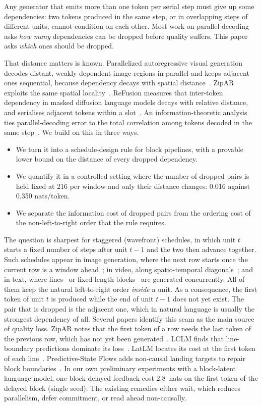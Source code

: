 \documentclass[11pt]{article}
\theoremstyle{definition}
\theoremstyle{remark}
\begin{document}
Any generator that emits more than one token per serial step must give up some dependencies: two tokens produced in the same step, or in overlapping steps of different units, cannot condition on each other.
Most work on parallel decoding asks \emph{how many} dependencies can be dropped before quality suffers.
This paper asks \emph{which} ones should be dropped.

That distance matters is known.
Parallelized autoregressive visual generation decodes distant, weakly dependent image regions in parallel and keeps adjacent ones sequential, because dependency decays with spatial distance~\citep{wang2025par}.
ZipAR exploits the same spatial locality~\citep{he2025zipar}.
ReFusion measures that inter-token dependency in masked diffusion language models decays with relative distance, and serialises adjacent tokens within a slot~\citep{li2025refusion}.
An information-theoretic analysis ties parallel-decoding error to the total correlation among tokens decoded in the same step~\citep{zhang2026generation}.
We build on this in three ways.
\begin{itemize}
  \item[(i)] We turn it into a schedule-design rule for block pipelines, with a provable lower bound on the distance of every dropped dependency.
  \item[(ii)] We quantify it in a controlled setting where the number of dropped pairs is held fixed at 216 per window and only their distance changes: 0.016 against 0.350 nats/token.
  \item[(iii)] We separate the information cost of dropped pairs from the ordering cost of the non-left-to-right order that the rule requires.
\end{itemize}

The question is sharpest for staggered (wavefront) schedules, in which unit $t$ starts a fixed number of steps after unit $t-1$ and the two then advance together.
Such schedules appear in image generation, where the next row starts once the current row is a window ahead~\citep{he2025zipar}; in video, along spatio-temporal diagonals~\citep{ye2025diagonal}; and in text, where lines~\citep{li2026lclm,zhang2026latlm} or fixed-length blocks~\citep{he2026psf} are generated concurrently.
All of them keep the natural left-to-right order \emph{inside} a unit.
As a consequence, the first token of unit $t$ is produced while the end of unit $t-1$ does not yet exist.
The pair that is dropped is the adjacent one, which in natural language is usually the strongest dependency of all.
Several papers identify this seam as the main source of quality loss.
ZipAR notes that the first token of a row needs the last token of the previous row, which has not yet been generated~\citep{he2025zipar}.
LCLM finds that line-boundary predictions dominate its loss~\citep{li2026lclm}.
LatLM locates its cost at the first token of each line~\citep{zhang2026latlm}.
Predictive-State Flows adds non-causal landing targets to repair block boundaries~\citep{he2026psf}.
In our own preliminary experiments with a block-latent language model, one-block-delayed feedback cost 2.8~nats on the first token of the delayed block (single seed).
The existing remedies either wait, which reduces parallelism, defer commitment, or read ahead non-causally.
\end{document}
